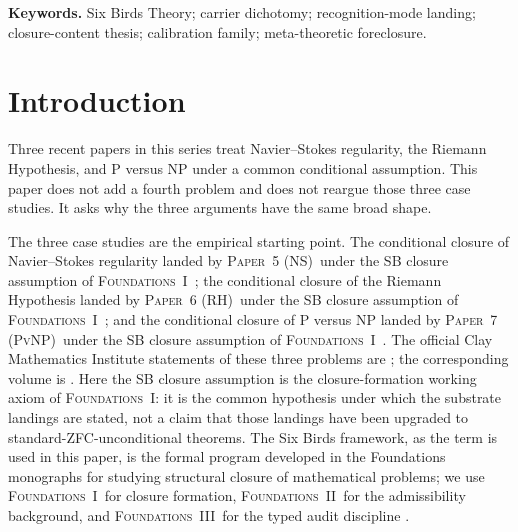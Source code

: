 \documentclass[11pt]{article}
\newcommand{\FOne}{\textsc{Foundations~I}}
\newcommand{\FTwo}{\textsc{Foundations~II}}
\newcommand{\FThree}{\textsc{Foundations~III}}
\newcommand{\PaperNS}{\textsc{Paper~5 (NS)}}
\newcommand{\PaperRH}{\textsc{Paper~6 (RH)}}
\newcommand{\PaperPvNP}{\textsc{Paper~7 (PvNP)}}
\theoremstyle{definition}
\begin{document}
\medskip
\noindent\textbf{Keywords.} Six Birds Theory; carrier dichotomy;
recognition-mode landing; closure-content thesis; calibration family;
meta-theoretic foreclosure.

\section{Introduction}\label{sec:intro}

Three recent papers in this series treat Navier--Stokes regularity,
the Riemann Hypothesis, and P versus NP under a common conditional
assumption.  This paper does not add a fourth problem and does not
reargue those three case studies.  It asks why the three arguments
have the same broad shape.

The three case studies are the empirical starting point.  The
conditional closure of Navier--Stokes regularity landed by \PaperNS\
under the SB closure assumption of \FOne\
\cite{Tsiokos2026NavierStokes,Tsiokos2026EmergenceCalculus}; the
conditional closure of the Riemann Hypothesis landed by \PaperRH\
under the SB closure assumption of \FOne\ \cite{Tsiokos2026RH}; and
the conditional closure of P versus NP landed by \PaperPvNP\ under
the SB closure assumption of \FOne\ \cite{Tsiokos2026PvNP}.  The
official Clay Mathematics Institute statements of these three
problems are
\cite{Fefferman2000NavierStokes,Bombieri2000Riemann,Cook2000PvsNP};
the corresponding volume is
\cite{CarlsonJaffeWiles2006MillenniumPrize}.  Here the
SB closure assumption is the closure-formation working axiom of
\FOne: it is the common hypothesis under which the substrate landings
are stated, not a claim that those landings have been upgraded to
standard-ZFC-unconditional theorems.  The Six Birds framework, as the
term is used in this paper, is the formal program developed in the
Foundations monographs for studying structural closure of mathematical
problems; we use \FOne\ for closure formation, \FTwo\ for the
admissibility background, and \FThree\ for the typed audit discipline
\cite{Tsiokos2026EmergenceCalculus,Tsiokos2026FoundationsII,Tsiokos2026FoundationsIII}.
\end{document}
